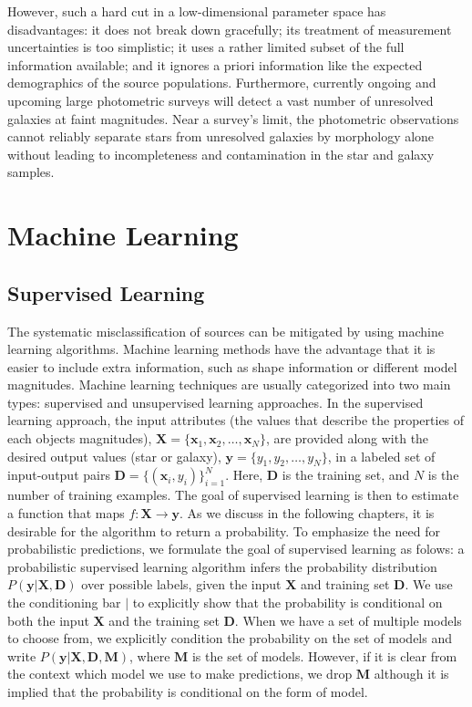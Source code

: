 However, such a hard cut in a low-dimensional parameter space has disadvantages:
it does not break down gracefully; its treatment of measurement uncertainties is too simplistic;
it uses a rather limited subset of the full information available;
and it ignores a priori information like the expected demographics of the source populations.
Furthermore, currently ongoing and upcoming large photometric surveys
will detect a vast number of unresolved galaxies at faint magnitudes.
Near a survey's limit, the photometric observations cannot reliably separate stars from unresolved galaxies
by morphology alone without leading to incompleteness and contamination in the star and galaxy samples.

\section{Machine Learning}

\subsection{Supervised Learning}

The systematic misclassification of sources can be mitigated by using machine learning algorithms.
Machine learning methods have the advantage that it is easier to include extra information,
such as shape information or different model magnitudes.
Machine learning techniques are usually categorized into two main types: supervised and unsupervised learning approaches.
In the supervised learning approach, the input attributes (\ie the values that describe the properties of each objects \eg magnitudes),
$\mathbf{X}= \{ \mathbf{x}_1,\mathbf{x}_2,\dots,\mathbf{x}_N \}$,
are provided along with the desired output values (\eg star or galaxy),
$\mathbf{y} = \{ y_1, y_2, \dots, y_N \}$, in a labeled set of input-output pairs
$\mathbf{D} = \{ \left( \mathbf{x}_i, y_i \right) \}_{i = 1}^N$.
Here, $\mathbf{D}$ is the training set, and $N$ is the number of training examples.
The goal of supervised learning is then to estimate a function that maps $f: \mathbf{X} \rightarrow \mathbf{y}$.
As we discuss in the following chapters, it is desirable for the algorithm to return a probability.
To emphasize the need for probabilistic predictions, we formulate the goal of supervised learning as folows:
a probabilistic supervised learning algorithm infers the probability distribution $P( \mathbf{y} | \mathbf{X}, \mathbf{D} )$
over possible labels, given the input $\mathbf{X}$ and training set $\mathbf{D}$.
We use the conditioning bar $|$ to explicitly show that the probability is conditional on both
the input $\mathbf{X}$ and the training set $\mathbf{D}$.
When we have a set of multiple models to choose from, we explicitly condition the probability on the set of models and write
$P \left( \mathbf{y} | \mathbf{X}, \mathbf{D}, \mathbf{M} \right)$, where $\mathbf{M}$ is the set of models.
However, if it is clear from the context which model we use to make predictions, we drop $\mathbf{M}$ although
it is implied that the probability is conditional on the form of model.

